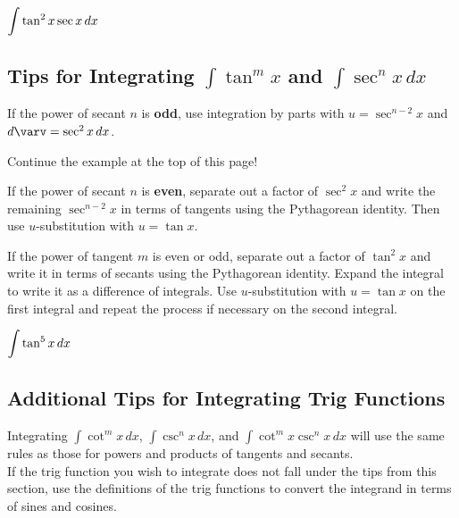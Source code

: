 \documentclass[12pt]{article}
\begin{document}
\Example $\displaystyle\int\tan^2x\sec x \,dx$

\vspace{40mm}

\subsection*{Tips for Integrating $\int\tan^m x$ and $\int\sec^n x\,dx$}

If the power of secant $n$ is \textbf{odd}, use integration by parts with $u=\sec^{n-2}x$ and $d\varv=\sec^2x\,dx$.

\ExampleCont Continue the example at the top of this page!


\vfill

If the power of secant $n$ is \textbf{even}, separate out a factor of $\sec^2x$ and write the remaining $\sec^{n-2}x$ in terms of tangents using the Pythagorean identity. Then use $u$-substitution with $u=\tan x$. 

\newpage

If the power of tangent $m$ is even or odd, separate out a factor of $\tan^2x$ and write it in terms of secants using the Pythagorean identity. Expand the integral to write it as a difference of integrals. Use $u$-substitution with $u=\tan x$ on the first integral and repeat the process if necessary on the second integral.

\Example $\displaystyle\int\tan^5 x\,dx$

\vfill

\subsection*{Additional Tips for Integrating Trig Functions}

Integrating $\int\cot^m x\,dx$, $\int \csc^n x\,dx$, and $\int\cot^m x\csc^n x\,dx$ will use the same rules as those for powers and products of tangents and secants.\\

If the trig function you wish to integrate does not fall under the tips from this section, use the definitions of the trig functions to convert the integrand in terms of sines and cosines.
\end{document}
